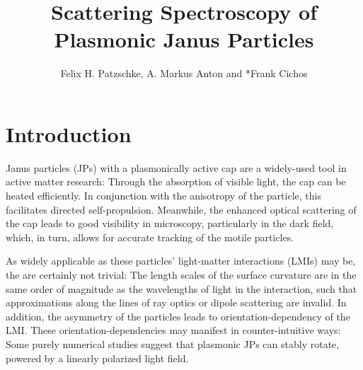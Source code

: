 \documentclass[10pt]{article}
\title{\sffamily\bfseries\color{Maroon} Scattering Spectroscopy of\\Plasmonic Janus Particles}
\author{Felix H. Patzschke, A. Markus Anton and *Frank Cichos}
\date{}
\begin{document}


\twocolumn[\maketitle \begin{abstract}\sffamily \vspace{-1em}  \\ \end{abstract}]


\section*{Introduction}


Janus particles (JPs) with a plasmonically active cap are a widely-used tool in active matter research: 
Through the absorption of visible light, the cap can be heated efficiently. 
In conjunction with the anisotropy of the particle, this facilitates directed self-propulsion. 
Meanwhile, the enhanced optical scattering of the cap leads to good visibility in microscopy, particularly in the dark field, which, in turn, allows for accurate tracking of the motile particles. 


As widely applicable as these particles' light-matter interactions (LMIs) may be, the are certainly not trivial: 
The length scales of the surface curvature are in the same order of magnitude as the wavelengths of light in the interaction, such that approximations along the lines of ray optics or dipole scattering are invalid. 
In addition, the asymmetry of the particles leads to orientation-dependency of the LMI. 
These orientation-dependencies may manifest in counter-intuitive ways: 
Some purely numerical studies suggest that plasmonic JPs can stably rotate, powered by a linearly polarized light field. \cite{Ilic2017,BA}
\end{document}
